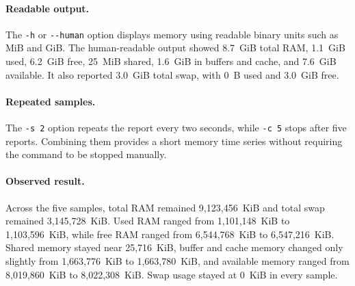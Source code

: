 
\paragraph{Readable output.}
The \texttt{-h} or \texttt{-{}-human} option displays memory using readable binary
units such as MiB and GiB. The human-readable output showed 8.7~GiB total RAM,
1.1~GiB used, 6.2~GiB free, 25~MiB shared, 1.6~GiB in buffers and cache, and
7.6~GiB available. It also reported 3.0~GiB total swap, with 0~B used and
3.0~GiB free.

\paragraph{Repeated samples.}
The \texttt{-s 2} option repeats the report every two seconds, while
\texttt{-c 5} stops after five reports. Combining them provides a short memory
time series without requiring the command to be stopped manually.

\paragraph{Observed result.}
Across the five samples, total RAM remained 9,123,456~KiB and total swap remained
3,145,728~KiB. Used RAM ranged from 1,101,148~KiB to 1,103,596~KiB, while free
RAM ranged from 6,544,768~KiB to 6,547,216~KiB. Shared memory stayed near
25,716~KiB, buffer and cache memory changed only slightly from 1,663,776~KiB to
1,663,780~KiB, and available memory ranged from 8,019,860~KiB to
8,022,308~KiB. Swap usage stayed at 0~KiB in every sample.
